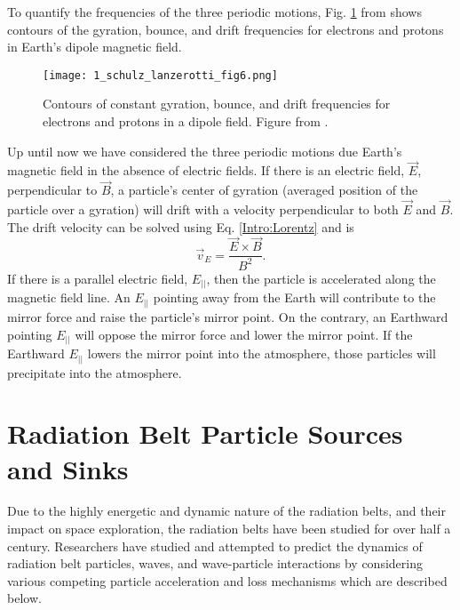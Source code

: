 To quantify the frequencies of the three periodic motions, Fig. \ref{Intro:adiabatic_frequencies} from \citet{Schulz1974} shows contours of the gyration, bounce, and drift frequencies for electrons and protons in Earth's dipole magnetic field. 

\begin{figure}
\texttt{[image: 1\_schulz\_lanzerotti\_fig6.png]}
\caption{Contours of constant gyration, bounce, and drift frequencies for electrons and protons in a dipole field. Figure from \citet{Schulz1974}.}
\label{Intro:adiabatic_frequencies}
\end{figure}

Up until now we have considered the three periodic motions due Earth's magnetic field in the absence of electric fields. If there is an electric field, $\vec{E}$, perpendicular to $\vec{B}$, a particle's center of gyration (averaged position of the particle over a gyration) will drift with a velocity perpendicular to both $\vec{E}$ and $\vec{B}$. The drift velocity can be solved using Eq. \ref{Intro:Lorentz} and is
\begin{equation}
\vec{v}_E = \frac{\vec{E} \times \vec{B}}{B^2}.
\end{equation} If there is a parallel electric field, $E_{||}$, then the particle is accelerated along the magnetic field line. An $E_{||}$  pointing away from the Earth will contribute to the mirror force and raise the particle's mirror point. On the contrary, an Earthward pointing $E_{||}$ will oppose the mirror force and lower the mirror point. If the Earthward $E_{||}$ lowers the mirror point into the atmosphere, those particles will precipitate into the atmosphere.

\section{Radiation Belt Particle Sources and Sinks}\label{Intro:sources_sinks}
Due to the highly energetic and dynamic nature of the radiation belts, and their impact on space exploration, the radiation belts have been studied for over half a century. Researchers have studied and attempted to predict the dynamics of radiation belt particles, waves, and wave-particle interactions by considering various competing particle acceleration and loss mechanisms which are described below.


